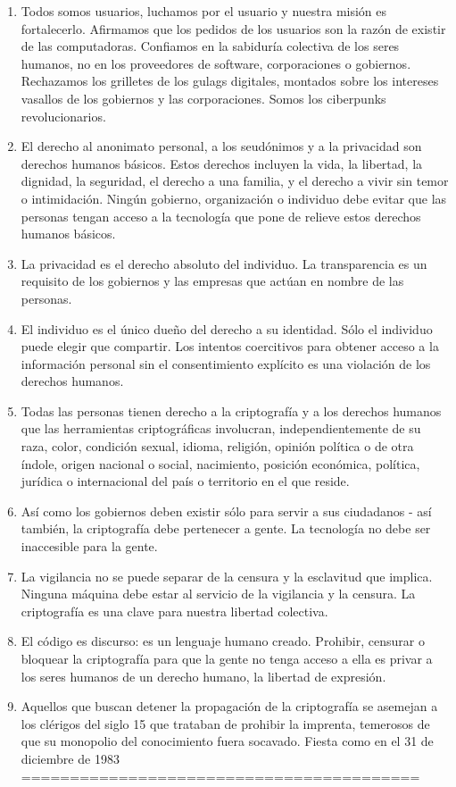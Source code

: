 \documentclass[10pt,a5paper,twoside,,]{book}
\begin{document}
\begin{enumerate}
\def\labelenumi{\arabic{enumi}.}
\item
  Todos somos usuarios, luchamos por el usuario y nuestra misión es
  fortalecerlo. Afirmamos que los pedidos de los usuarios son la razón
  de existir de las computadoras. Confiamos en la sabiduría colectiva de
  los seres humanos, no en los proveedores de software, corporaciones o
  gobiernos. Rechazamos los grilletes de los gulags digitales, montados
  sobre los intereses vasallos de los gobiernos y las corporaciones.
  Somos los ciberpunks revolucionarios.
\item
  El derecho al anonimato personal, a los seudónimos y a la privacidad
  son derechos humanos básicos. Estos derechos incluyen la vida, la
  libertad, la dignidad, la seguridad, el derecho a una familia, y el
  derecho a vivir sin temor o intimidación. Ningún gobierno,
  organización o individuo debe evitar que las personas tengan acceso a
  la tecnología que pone de relieve estos derechos humanos básicos.
\item
  La privacidad es el derecho absoluto del individuo. La transparencia
  es un requisito de los gobiernos y las empresas que actúan en nombre
  de las personas.
\item
  El individuo es el único dueño del derecho a su identidad. Sólo el
  individuo puede elegir que compartir. Los intentos coercitivos para
  obtener acceso a la información personal sin el consentimiento
  explícito es una violación de los derechos humanos.
\item
  Todas las personas tienen derecho a la criptografía y a los derechos
  humanos que las herramientas criptográficas involucran,
  independientemente de su raza, color, condición sexual, idioma,
  religión, opinión política o de otra índole, origen nacional o social,
  nacimiento, posición económica, política, jurídica o internacional del
  país o territorio en el que reside.
\item
  Así como los gobiernos deben existir sólo para servir a sus ciudadanos
  - así también, la criptografía debe pertenecer a gente. La tecnología
  no debe ser inaccesible para la gente.
\item
  La vigilancia no se puede separar de la censura y la esclavitud que
  implica. Ninguna máquina debe estar al servicio de la vigilancia y la
  censura. La criptografía es una clave para nuestra libertad colectiva.
\item
  El código es discurso: es un lenguaje humano creado. Prohibir,
  censurar o bloquear la criptografía para que la gente no tenga acceso
  a ella es privar a los seres humanos de un derecho humano, la libertad
  de expresión.
\item
  Aquellos que buscan detener la propagación de la criptografía se
  asemejan a los clérigos del siglo 15 que trataban de prohibir la
  imprenta, temerosos de que su monopolio del conocimiento fuera
  socavado. Fiesta como en el 31 de diciembre de 1983
  =========================================
\end{enumerate}
\end{document}
